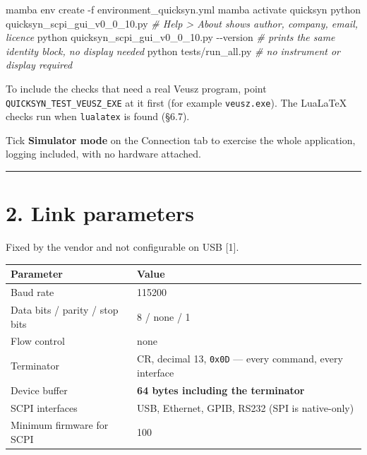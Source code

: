 \documentclass[
\directlua{luaotfload.add_fallback("qsfallback", {"DejaVu Sans:mode=harf;", "DejaVu Sans Mono:mode=harf;", "DejaVu Math TeX Gyre:mode=harf;"})}
  10pt,
  letterpaper,
]{article}
\newenvironment{Shaded}{}{}
\newcommand{\AttributeTok}[1]{\textcolor[rgb]{0.49,0.56,0.16}{#1}}
\newcommand{\CommentTok}[1]{\textcolor[rgb]{0.38,0.63,0.69}{\textit{#1}}}
\newcommand{\ExtensionTok}[1]{#1}
\newcommand{\NormalTok}[1]{#1}
\begin{document}
\begin{Shaded}
\begin{Highlighting}[]
\ExtensionTok{mamba}\NormalTok{ env create }\AttributeTok{{-}f}\NormalTok{ environment\_quicksyn.yml}
\ExtensionTok{mamba}\NormalTok{ activate quicksyn}
\ExtensionTok{python}\NormalTok{ quicksyn\_scpi\_gui\_v0\_0\_10.py            }\CommentTok{\# Help \textgreater{} About shows author, company, email, licence}
\ExtensionTok{python}\NormalTok{ quicksyn\_scpi\_gui\_v0\_0\_10.py }\AttributeTok{{-}{-}version}  \CommentTok{\# prints the same identity block, no display needed}
\ExtensionTok{python}\NormalTok{ tests/run\_all.py                       }\CommentTok{\# no instrument or display required}
\end{Highlighting}
\end{Shaded}

To include the checks that need a real Veusz program, point
\texttt{QUICKSYN\_TEST\_VEUSZ\_EXE} at it first (for example
\texttt{veusz.exe}). The LuaLaTeX checks run when \texttt{lualatex} is
found (§6.7).

Tick \textbf{Simulator mode} on the Connection tab to exercise the whole
application, logging included, with no hardware attached.

\begin{center}\rule{0.5\linewidth}{0.5pt}\end{center}

\hypertarget{link-parameters}{%
\section{2. Link parameters}\label{link-parameters}}

Fixed by the vendor and not configurable on USB {[}1{]}.

\begin{longtable}[]{@{}ll@{}}
\toprule\noalign{}
Parameter & Value \\
\midrule\noalign{}
\endhead
\bottomrule\noalign{}
\endlastfoot
Baud rate & 115200 \\
Data bits / parity / stop bits & 8 / none / 1 \\
Flow control & none \\
Terminator & CR, decimal 13, \texttt{0x0D} --- every command, every
interface \\
Device buffer & \textbf{64 bytes including the terminator} \\
SCPI interfaces & USB, Ethernet, GPIB, RS232 (SPI is native-only) \\
Minimum firmware for SCPI & 100 \\
\end{longtable}
\end{document}
